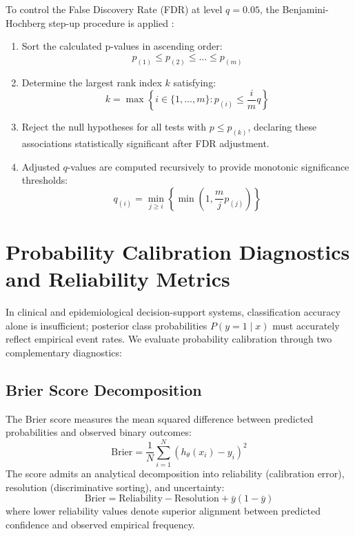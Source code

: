 \documentclass[conference]{IEEEtran}
\begin{document}
To control the False Discovery Rate (FDR) at level $q = 0.05$, the Benjamini-Hochberg step-up procedure is applied \cite{hastie2009elements}:
\begin{enumerate}
    \item Sort the calculated p-values in ascending order:
    \begin{equation}
    p_{(1)} \le p_{(2)} \le \dots \le p_{(m)}
    \end{equation}
    \item Determine the largest rank index $k$ satisfying:
    \begin{equation}
    k = \max \left\{ i \in \{1, \dots, m\} : p_{(i)} \le \frac{i}{m} q \right\}
    \end{equation}
    \item Reject the null hypotheses for all tests with $p \le p_{(k)}$, declaring these associations statistically significant after FDR adjustment.
    \item Adjusted $q$-values are computed recursively to provide monotonic significance thresholds:
    \begin{equation}
    q_{(i)} = \min_{j \ge i} \left\{ \min\left(1, \frac{m}{j} p_{(j)}\right) \right\}
    \end{equation}
\end{enumerate}

\section{Probability Calibration Diagnostics and Reliability Metrics}
In clinical and epidemiological decision-support systems, classification accuracy alone is insufficient; posterior class probabilities $P(y=1 \mid x)$ must accurately reflect empirical event rates. We evaluate probability calibration through two complementary diagnostics:

\subsection{Brier Score Decomposition}
The Brier score measures the mean squared difference between predicted probabilities and observed binary outcomes:
\begin{equation}
\text{Brier} = \frac{1}{N} \sum_{i=1}^N (h_\theta(x_i) - y_i)^2
\end{equation}
The score admits an analytical decomposition into reliability (calibration error), resolution (discriminative sorting), and uncertainty:
\begin{equation}
\text{Brier} = \text{Reliability} - \text{Resolution} + \bar{y}(1 - \bar{y})
\end{equation}
where lower reliability values denote superior alignment between predicted confidence and observed empirical frequency.
\end{document}
